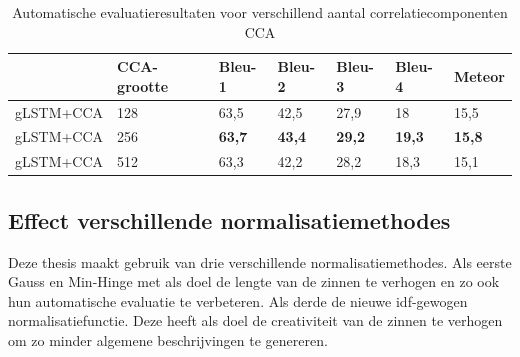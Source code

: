 \begin{table}
	\centering
	\begin{tabular}{lllllll}
		~              & CCA-grootte     & Bleu-1 & Bleu-2 & Bleu-3 & Bleu-4 & Meteor \\ \hline
		gLSTM+CCA & 128        & 63,5   & 42,5 			& 27,9   & 18   & 15,5  \\
		gLSTM+CCA & 256        & \textbf{63,7}   & \textbf{43,4}   & \textbf{29,2}   & \textbf{19,3}   & \textbf{15,8}  \\
		gLSTM+CCA & 512        & 63,3   & 42,2   & 28,2   & 18,3 & 15,1  \\ \hline
	
	\end{tabular}

	\caption{Automatische evaluatieresultaten voor verschillend aantal correlatiecomponenten CCA}
		\label{table:results_cca}
\end{table}

\subsection{Effect verschillende normalisatiemethodes}
Deze thesis maakt gebruik van drie verschillende normalisatiemethodes. Als eerste Gauss en Min-Hinge met als doel de lengte van de zinnen te verhogen en zo ook hun automatische evaluatie te verbeteren. Als derde de nieuwe idf-gewogen normalisatiefunctie. Deze heeft als doel de creativiteit van de zinnen te verhogen om zo minder algemene beschrijvingen te genereren.

